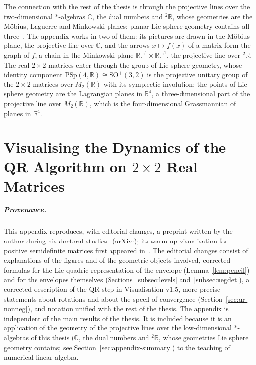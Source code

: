 \documentclass[12pt, a4paper]{report}
\theoremstyle{plain}
\theoremstyle{definition}
\theoremstyle{remark}
\theoremstyle{plain}
\newcommand{\RR}{\mathbb{R}}
\newcommand{\CC}{\mathbb{C}}
\newcommand{\RP}{\mathbb{RP}}
\newcommand{\SO}{\mathrm{SO}}
\newcommand{\twoR}{{}^{2}\mathbb{R}}
\begin{document}
The connection with the rest of the thesis is through the projective lines over the two-dimensional $*$-algebras $\CC$, the dual numbers and $\twoR$, whose geometries are the M\"obius, Laguerre and Minkowski planes; planar Lie sphere geometry contains all three~\cite{Benz1973,Yaglom1968-ComplexNumbers,cecil1992lie}. The appendix works in two of them: its pictures are drawn in the M\"obius plane, the projective line over $\CC$, and the arrows $x\mapsto f(x)$ of a matrix form the graph of $f$, a chain in the Minkowski plane $\RP^1\times\RP^1$, the projective line over $\twoR$. The real $2\times2$ matrices enter through the group of Lie sphere geometry, whose identity component $\mathrm{PSp}(4,\RR)\cong\SO^+(3,2)$ is the projective unitary group of the $2\times2$ matrices over $M_2(\RR)$ with its symplectic involution; the points of Lie sphere geometry are the Lagrangian planes in $\RR^4$, a three-dimensional part of the projective line over $M_2(\RR)$, which is the four-dimensional Grassmannian of planes in $\RR^4$.
\cleardoublepage
{}
{}



\appendix
\chapter{Visualising the Dynamics of the QR Algorithm on \texorpdfstring{$2\times2$}{2x2} Real Matrices}
\label{chap:gutin-2022}

\paragraph{Provenance.} This appendix reproduces, with editorial changes, a preprint written by the author during his doctoral studies~\cite{Gutin2022Visualisation} (arXiv:); its warm-up visualisation for positive semidefinite matrices first appeared in~\cite{Gutin2022PSD}. The editorial changes consist of explanations of the figures and of the geometric objects involved, corrected formulas for the Lie quadric representation of the envelope (Lemma~\ref{lem:pencil}) and for the envelopes themselves (Sections~\ref{subsec:levels} and~\ref{subsec:negdet}), a corrected description of the QR step in Visualisation v1.5, more precise statements about rotations and about the speed of convergence (Section~\ref{sec:qr-nonneg}), and notation unified with the rest of the thesis. The appendix is independent of the main results of the thesis. It is included because it is an application of the geometry of the projective lines over the low-dimensional $*$-algebras of this thesis ($\CC$, the dual numbers and $\twoR$, whose geometries Lie sphere geometry contains; see Section~\ref{sec:appendix-summary}) to the teaching of numerical linear algebra.
\end{document}
